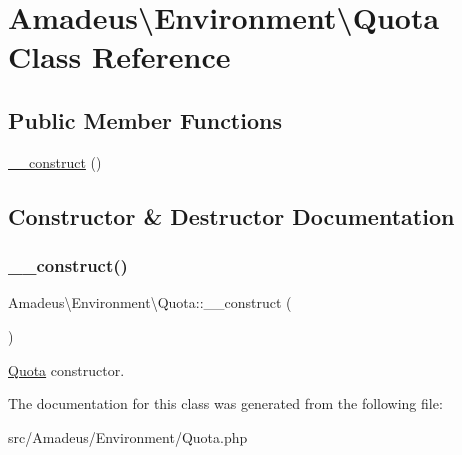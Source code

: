 \hypertarget{classAmadeus_1_1Environment_1_1Quota}{}\section{Amadeus\textbackslash{}Environment\textbackslash{}Quota Class Reference}
\label{classAmadeus_1_1Environment_1_1Quota}
\subsection*{Public Member Functions}
\begin{DoxyCompactItemize}
\item 
\hyperlink{classAmadeus_1_1Environment_1_1Quota_a9129d0283fce4f7176a136efad8f5736}{\+\_\+\+\_\+construct} ()
\end{DoxyCompactItemize}


\subsection{Constructor \& Destructor Documentation}
\mbox{\label{classAmadeus_1_1Environment_1_1Quota_a9129d0283fce4f7176a136efad8f5736}} 
\subsubsection{\texorpdfstring{\+\_\+\+\_\+construct()}{\_\_construct()}}
{\footnotesize\ttfamily Amadeus\textbackslash{}\+Environment\textbackslash{}\+Quota\+::\+\_\+\+\_\+construct (\begin{DoxyParamCaption}{ }\end{DoxyParamCaption})}

\hyperlink{classAmadeus_1_1Environment_1_1Quota}{Quota} constructor. 

The documentation for this class was generated from the following file\+:\begin{DoxyCompactItemize}
\item 
src/\+Amadeus/\+Environment/Quota.\+php\end{DoxyCompactItemize}
